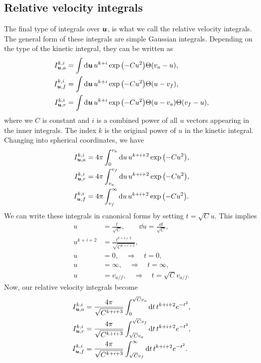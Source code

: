 \documentclass[aps,prl,preprint,groupedaddress,10pt]{revtex4-2}
\begin{document}
\subsection{Relative velocity integrals}
The final type of integrals over $\vb*{u}$, is what we call the relative velocity integrals. The general form
of these integrals are simple Gaussian integrals. Depending on the type of the kinetic integral,
they can be written as
\begin{equation}
    \begin{split}
        I_{\bu,a}^{k,i}&=\int\dd{\bu}u^{k+i}\exp\pqty{-Cu^2}\Theta\pqty{v_a-u},\\
        I_{\bu,f}^{k,i}&=\int\dd{\bu}u^{k+i}\exp\pqty{-Cu^2}\Theta\pqty{u-v_f},\\
        I_{\bu,r}^{k,i}&=\int\dd{\bu}u^{k+i}\exp\pqty{-Cu^2}\Theta\pqty{u-v_a}\Theta\pqty{v_f-u},
    \end{split}
\end{equation}
where we $C$ is constant and $i$ is a combined power of all $u$ vectors appearing in the inner integrals.
The index $k$ is the original power of $u$ in the kinetic integral. Changing into spherical coordinates,
we have
\begin{equation}
    \begin{split}
        I_{\bu,a}^{k,i}&=4\pi\int_{0}^{v_a}\dd{u}u^{k+i+2}\exp\pqty{-Cu^2},\\
        I_{\bu,r}^{k,i}&=4\pi\int_{v_a}^{v_f}\dd{u}u^{k+i+2}\exp\pqty{-Cu^2},\\
        I_{\bu,f}^{k,i}&=4\pi\int_{v_f}^{\infty}\dd{u}u^{k+i+2}\exp\pqty{-Cu^2}.
    \end{split}
\end{equation}
We can write these integrals in canonical forms by setting $t=\sqrt{C}u$. This implies
\begin{equation}
    \begin{split}
        u&=\frac{t}{\sqrt{C}},\qquad\dd{u}=\frac{\dd{t}}{\sqrt{C}},\\
        u^{k+i+2}&=\frac{t^{k+i+2}}{\sqrt{C^{k+i+2}}},\\
        u&=0,\quad\Rightarrow\quad t=0,\\
        u&=\infty,\quad\Rightarrow\quad t=\infty,\\
        u&=v_{a/f},\quad\Rightarrow\quad t=\sqrt{C}v_{a/f}.
    \end{split}
\end{equation}
Now, our relative velocity integrals become
\begin{equation}
    \begin{split}
        I_{\vb*{u},a}^{k,i}&=\frac{4\pi}{\sqrt{C^{k+i+3}}}\int_{0}^{\sqrt{C}v_a}\dd{t}t^{k+i+2}e^{-t^2},\\
        I_{\vb*{u},r}^{k,i}&=\frac{4\pi}{\sqrt{C^{k+i+3}}}\int_{\sqrt{C}v_a}^{\sqrt{C}v_f}
        \dd{t}t^{k+i+2}e^{-t^2},\\
        I_{\vb*{u},f}^{k,i}&=\frac{4\pi}{\sqrt{C^{k+i+3}}}\int_{\sqrt{C}v_f}^{\infty}\dd{t}t^{k+i+2}e^{-t^2}.
    \end{split}
\end{equation}
\end{document}

